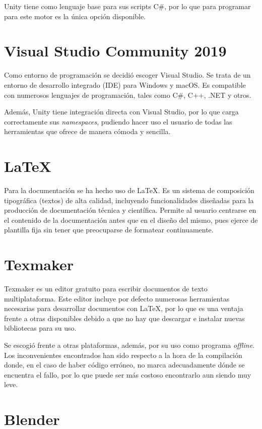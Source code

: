 Unity tiene como lenguaje base para sus scripts C\#, por lo que para programar para este motor es la única opción disponible.

\section{Visual Studio Community 2019}

Como entorno de programación se decidió escoger Visual Studio. Se trata de un entorno de desarrollo integrado (IDE) para Windows y macOS. Es compatible con numerosos lenguajes de programación, tales como C\#, C++, .NET y otros. 

Además, Unity tiene integración directa con Visual Studio, por lo que carga correctamente sus \textit{namespaces}, pudiendo hacer uso el usuario de todas las herramientas que ofrece de manera cómoda y sencilla.

\section{LaTeX}

Para la documentación se ha hecho uso de LaTeX. Es un sistema de composición tipográfica (textos) de alta calidad, incluyendo funcionalidades diseñadas para la producción de documentación técnica y científica. Permite al usuario centrarse en el contenido de la documentación antes que en el diseño del mismo, pues ejerce de plantilla fija sin tener que preocuparse de formatear continuamente.

\section{Texmaker}

Texmaker es un editor gratuito para escribir documentos de texto multiplataforma. Este editor incluye por defecto numerosas herramientas necesarias para desarrollar documentos con LaTeX, por lo que es una ventaja frente a otras disponibles debido a que no hay que descargar e instalar nuevas bibliotecas para su uso.

Se escogió frente a otras plataformas, además, por su uso como programa \textit{offline}. Los inconvenientes encontrados han sido respecto a la hora de la compilación donde, en el caso de haber código erróneo, no marca adecuadamente dónde se encuentra el fallo, por lo que puede ser más costoso encontrarlo aun siendo muy leve.

\section{Blender}


